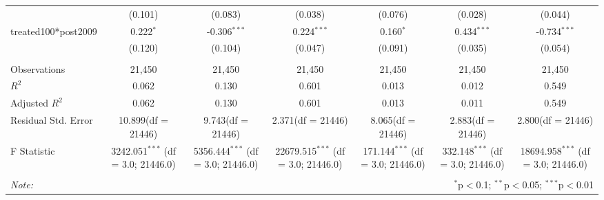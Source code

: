 \documentclass[12pt]{article}
\begin{document}
\begin{table}[!htbp]
\begin{tabular}{@{\extracolsep{5pt}}lcccccc}
  & (0.101) & (0.083) & (0.038) & (0.076) & (0.028) & (0.044) \\
 treated100*post2009 & 0.222$^{*}$ & -0.306$^{***}$ & 0.224$^{***}$ & 0.160$^{*}$ & 0.434$^{***}$ & -0.734$^{***}$ \\
  & (0.120) & (0.104) & (0.047) & (0.091) & (0.035) & (0.054) \\
\hline \\[-1.8ex]
 Observations & 21,450 & 21,450 & 21,450 & 21,450 & 21,450 & 21,450 \\
 $R^2$ & 0.062 & 0.130 & 0.601 & 0.013 & 0.012 & 0.549 \\
 Adjusted $R^2$ & 0.062 & 0.130 & 0.601 & 0.013 & 0.011 & 0.549 \\
 Residual Std. Error & 10.899(df = 21446) & 9.743(df = 21446) & 2.371(df = 21446) & 8.065(df = 21446) & 2.883(df = 21446) & 2.800(df = 21446)  \\
 F Statistic & 3242.051$^{***}$ (df = 3.0; 21446.0) & 5356.444$^{***}$ (df = 3.0; 21446.0) & 22679.515$^{***}$ (df = 3.0; 21446.0) & 171.144$^{***}$ (df = 3.0; 21446.0) & 332.148$^{***}$ (df = 3.0; 21446.0) & 18694.958$^{***}$ (df = 3.0; 21446.0) \\
\hline
\hline \\[-1.8ex]
\textit{Note:} & \multicolumn{6}{r}{$^{*}$p$<$0.1; $^{**}$p$<$0.05; $^{***}$p$<$0.01} \\
\end{tabular}
\end{table}
\end{document}
